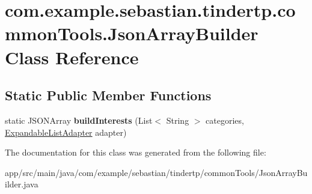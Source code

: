 \hypertarget{classcom_1_1example_1_1sebastian_1_1tindertp_1_1commonTools_1_1JsonArrayBuilder}{}\section{com.\+example.\+sebastian.\+tindertp.\+common\+Tools.\+Json\+Array\+Builder Class Reference}
\label{classcom_1_1example_1_1sebastian_1_1tindertp_1_1commonTools_1_1JsonArrayBuilder}
\subsection*{Static Public Member Functions}
\begin{DoxyCompactItemize}
\item 
static J\+S\+O\+N\+Array {\bfseries build\+Interests} (List$<$ String $>$ categories, \hyperlink{classcom_1_1example_1_1sebastian_1_1tindertp_1_1ExpandableListAdapter}{Expandable\+List\+Adapter} adapter)\hypertarget{classcom_1_1example_1_1sebastian_1_1tindertp_1_1commonTools_1_1JsonArrayBuilder_adb3b51598a1662b8189de3326457a237}{}\label{classcom_1_1example_1_1sebastian_1_1tindertp_1_1commonTools_1_1JsonArrayBuilder_adb3b51598a1662b8189de3326457a237}

\end{DoxyCompactItemize}


The documentation for this class was generated from the following file\+:\begin{DoxyCompactItemize}
\item 
app/src/main/java/com/example/sebastian/tindertp/common\+Tools/Json\+Array\+Builder.\+java\end{DoxyCompactItemize}
